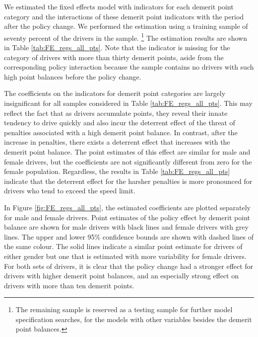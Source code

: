 \documentclass[12pt]{paper}
\begin{document}
We estimated the fixed effects model with indicators for each demerit point category
and the interactions of these demerit point indicators with the period after the policy change. 
We performed the estimation using a training sample of seventy percent of the drivers in the sample.%
\footnote{The remaining sample is reserved as a testing sample for further model specification searches, for the models with other variables besides the demerit point balances. }
The estimation results are shown in Table \ref{tab:FE_regs_all_pts}. 
% 
Note that the indicator is missing for the category of drivers with more than thirty demerit points, 
aside from the corresponding policy interaction because the sample contains no drivers with such high point balances before the policy change. 
% 



The coefficients on the indicators for demerit point categories are largely insignificant for all samples considered in Table \ref{tab:FE_regs_all_pts}. 
This may reflect the fact that as drivers accumulate points, they reveal their innate tendency to drive quickly and also incur the deterrent effect of the threat of penalties associated with a high demerit point balance. 
In contrast, after the increase in penalties, there exists a deterrent effect that increases with the demerit point balance. 
The point estimates of this effect are similar for male and female drivers, 
but the coefficients are not significantly different from zero for the female population. 
Regardless, the results in Table \ref{tab:FE_regs_all_pts} indicate that the deterrent effect
for the harsher penalties is more pronounced for drivers who tend to exceed the speed limit. 


% 






In Figure \ref{fig:FE_regs_all_pts}, the estimated coefficients are plotted separately for male and female drivers. 
Point estimates of the policy effect by demerit point balance are shown for male drivers with black lines and female drivers with grey lines. 
The upper and lower 95\% confidence bounds are shown with dashed lines of the same colour. 
The solid lines indicate a similar point estimate for drivers of either gender but one that is estimated with more variability for female drivers. 
For both sets of drivers, it is clear that the policy change had a stronger effect for drivers with 
higher demerit point balances, and an especially strong effect on drivers with more than ten demerit points. 
\end{document}
